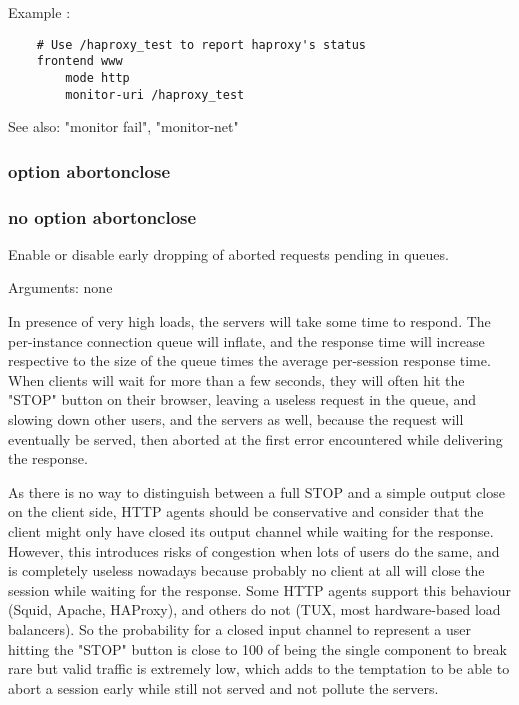   Example :
\begin{verbatim}
    # Use /haproxy_test to report haproxy's status
    frontend www
        mode http
        monitor-uri /haproxy_test
\end{verbatim}

  See also: "monitor fail", "monitor-net"

\subsubsection{option abortonclose}
\subsubsection{no option abortonclose}
  
  Enable or disable early dropping of aborted requests pending in queues.

   
  Arguments: none

  In presence of very high loads, the servers will take some time to respond.
  The per-instance connection queue will inflate, and the response time will
  increase respective to the size of the queue times the average per-session
  response time. When clients will wait for more than a few seconds, they will
  often hit the "STOP" button on their browser, leaving a useless request in
  the queue, and slowing down other users, and the servers as well, because the
  request will eventually be served, then aborted at the first error
  encountered while delivering the response.

  As there is no way to distinguish between a full STOP and a simple output
  close on the client side, HTTP agents should be conservative and consider
  that the client might only have closed its output channel while waiting for
  the response. However, this introduces risks of congestion when lots of users
  do the same, and is completely useless nowadays because probably no client at
  all will close the session while waiting for the response. Some HTTP agents
  support this behaviour (Squid, Apache, HAProxy), and others do not (TUX, most
  hardware-based load balancers). So the probability for a closed input channel
  to represent a user hitting the "STOP" button is close to 100%
  of being the single component to break rare but valid traffic is extremely
  low, which adds to the temptation to be able to abort a session early while
  still not served and not pollute the servers.

